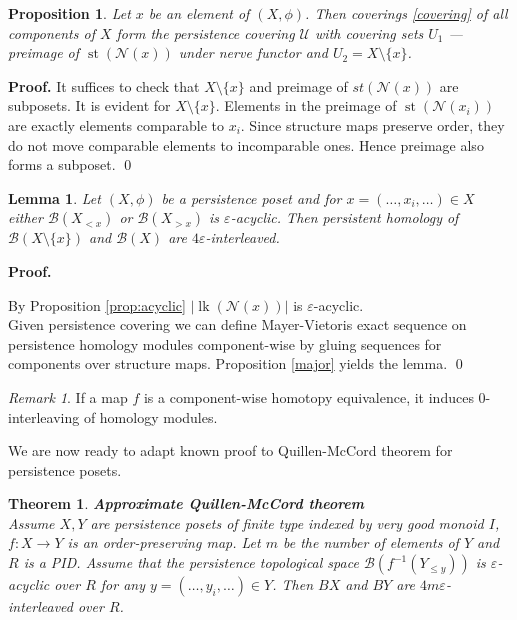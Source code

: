 \documentclass[english,12pt]{article}
\newcounter{stmcounter}[section]
\newcounter{thcounter}
\numberwithin{equation}{section}
\newtheorem{proposition}[stmcounter]{Proposition}
\newtheorem{lemma}[stmcounter]{Lemma}
\newtheorem{theorem}[thcounter]{Theorem}
\theoremstyle{definition}
\theoremstyle{remark}
\newtheorem{remark}[stmcounter]{Remark}
\newenvironment{pf}{\noindent\textbf{Proof.}}{\qed}
\begin{document}
\begin{proposition}
  Let $x$ be an element of $(X,\phi)$. Then coverings \eqref{covering} of all components of $X$ form the persistence covering $\mathcal{U}$ with covering sets $U_1$ --- preimage of $\operatorname{st}(\mathcal{N}(x))$ under nerve functor and $U_2 = X \setminus \{x\}$.
\end{proposition}

\begin{pf}
  It suffices to check that $X \setminus \{x\}$ and preimage of $st(\mathcal{N}(x))$ are subposets.
  It is evident for $X \setminus \{x\}$. Elements in the preimage of $\operatorname{st}(\mathcal{N}(x_i))$ are exactly elements comparable to $x_i$. Since structure maps preserve order, they do not move comparable elements to incomparable ones. Hence preimage also forms a subposet.
\end{pf}\\

\begin{lemma}
  Let $(X,\phi)$ be a persistence poset and for $x=(\ldots,x_i,\ldots) \in X$ either $\mathcal{B}(X_{< x})$ or $\mathcal{B}(X_{> x})$ is $\varepsilon$-acyclic. Then persistent homology of $\mathcal{B}(X \setminus \{x\})$ and $\mathcal{B}(X)$ are $4\varepsilon$-interleaved.
\end{lemma}

\begin{pf} ~ \par
  By Proposition \ref{prop:acyclic} $\left|\operatorname{lk}(\mathcal{N}(x))\right|$ is $\varepsilon$-acyclic.\\

  Given persistence covering we can define Mayer-Vietoris exact sequence on persistence homology modules component-wise by gluing sequences for components over structure maps. Proposition \ref{major} yields the lemma.
\end{pf}

\begin{remark}
  If a map $f$ is a component-wise homotopy equivalence, it induces $0$-interleaving of homology modules.
\end{remark}

We are now ready to adapt known proof to Quillen-McCord theorem for persistence posets.

\begin{theorem} \textbf{Approximate Quillen-McCord theorem}\\
  Assume $X, Y$ are persistence posets of finite type indexed by very good monoid $I$, $f : X \to Y$ is an order-preserving map. Let $m$ be the number of elements of $Y$ and $R$ is a PID. Assume that the persistence topological space $\mathcal{B}(f^{-1}(Y_{\leqslant y}))$ is $\varepsilon$-acyclic over $R$ for any $y=(\ldots,y_i,\ldots) \in Y$. Then $BX$ and $BY$ are $4m\varepsilon$-interleaved over $R$.\\
\end{theorem}
\end{document}
